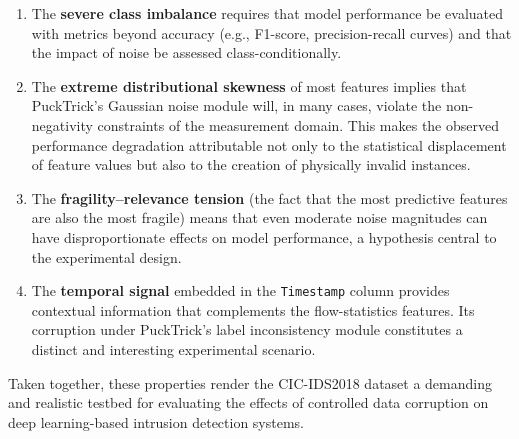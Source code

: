 \documentclass[../main.tex]{subfiles}
\begin{document}
\begin{enumerate}
  \item The \textbf{severe class imbalance} requires that model performance be
        evaluated with metrics beyond accuracy (e.g., F1-score,
        precision-recall curves) and that the impact of noise be assessed
        class-conditionally.
  \item The \textbf{extreme distributional skewness} of most features implies
        that PuckTrick's Gaussian noise module will, in many cases, violate
        the non-negativity constraints of the measurement domain.  This makes
        the observed performance degradation attributable not only to the
        statistical displacement of feature values but also to the creation of
        physically invalid instances.
  \item The \textbf{fragility–relevance tension} (the fact that the most
        predictive features are also the most fragile) means that even
        moderate noise magnitudes can have disproportionate effects on model
        performance, a hypothesis central to the experimental design.
  \item The \textbf{temporal signal} embedded in the \texttt{Timestamp}
        column provides contextual information that complements the
        flow-statistics features.  Its corruption under PuckTrick's label
        inconsistency module constitutes a distinct and interesting experimental
        scenario.
\end{enumerate}

Taken together, these properties render the CIC-IDS2018 dataset a demanding and
realistic testbed for evaluating the effects of controlled data corruption on
deep learning-based intrusion detection systems.
\end{document}
